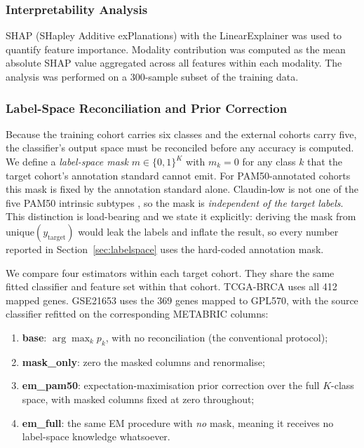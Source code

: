 \documentclass[11pt,a4paper]{article}
\begin{document}
\subsubsection{Interpretability Analysis}
SHAP (SHapley Additive exPlanations) \citep{lundberg2017unified} with the LinearExplainer was used to quantify feature importance. Modality contribution was computed as the mean absolute SHAP value aggregated across all features within each modality. The analysis was performed on a 300-sample subset of the training data.

\subsubsection{Label-Space Reconciliation and Prior Correction}
\label{sec:methods_shift}

Because the training cohort carries six classes and the external cohorts carry five, the
classifier's output space must be reconciled before any accuracy is computed. We define a
\emph{label-space mask} $m \in \{0,1\}^K$ with $m_k = 0$ for any class $k$ that the target
cohort's annotation standard cannot emit. For PAM50-annotated cohorts this mask is fixed by the
annotation standard alone. Claudin-low is not one of the five PAM50 intrinsic subtypes
\citep{parker2009supervised}, so the mask is \emph{independent of the target labels}. This
distinction is load-bearing and we state it explicitly: deriving the mask from
$\mathrm{unique}(y_{\text{target}})$ would leak the labels and inflate the result, so every
number reported in Section~\ref{sec:labelspace} uses the hard-coded annotation mask.

We compare four estimators within each target cohort. They share the same fitted classifier and
feature set within that cohort. TCGA-BRCA uses all 412 mapped genes. GSE21653 uses the 369 genes
mapped to GPL570, with the source classifier refitted on the corresponding METABRIC columns:

\begin{enumerate}[nosep]
  \item \textbf{base}: $\arg\max_k p_k$, with no reconciliation (the conventional protocol);
  \item \textbf{mask\_only}: zero the masked columns and renormalise;
  \item \textbf{em\_pam50}: expectation-maximisation prior correction \citep{saerens2002adjusting}
        over the full $K$-class space, with masked columns fixed at zero throughout;
  \item \textbf{em\_full}: the same EM procedure with \emph{no} mask, meaning it receives no label-space
        knowledge whatsoever.
\end{enumerate}
\end{document}
